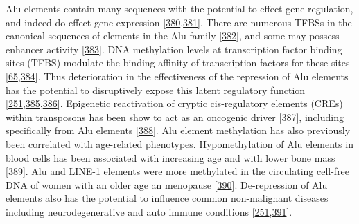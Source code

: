 \documentclass[
]{book}
\begin{document}
Alu elements contain many sequences with the potential to effect gene regulation, and indeed do effect gene expression {[}\protect\hyperlink{ref-Chen2017b}{380},\protect\hyperlink{ref-RobertoFerrari2019}{381}{]}.
There are numerous TFBSs in the canonical sequences of elements in the Alu family {[}\protect\hyperlink{ref-Polak2006}{382}{]}, and some may possess enhancer activity {[}\protect\hyperlink{ref-Su2014}{383}{]}.
DNA methylation levels at transcription factor binding sites (TFBS) modulate the binding affinity of transcription factors for these sites {[}\protect\hyperlink{ref-Yin2017}{65},\protect\hyperlink{ref-Blattler2014}{384}{]}.
Thus deterioration in the effectiveness of the repression of Alu elements has the potential to disruptively expose this latent regulatory function {[}\protect\hyperlink{ref-Chuong2017}{251},\protect\hyperlink{ref-Ward2013}{385},\protect\hyperlink{ref-Xie2013}{386}{]}.
Epigenetic reactivation of cryptic cis-regulatory elements (CREs) within transposons has been show to act as an oncogenic driver {[}\protect\hyperlink{ref-Jang2019}{387}{]}, including specifically from Alu elements {[}\protect\hyperlink{ref-Rajendiran2016}{388}{]}.
Alu element methylation has also previously been correlated with age-related phenotypes.
Hypomethylation of Alu elements in blood cells has been associated with increasing age and with lower bone mass {[}\protect\hyperlink{ref-Jintaridth2013}{389}{]}.
Alu and LINE-1 elements were more methylated in the circulating cell-free DNA of women with an older age an menopause {[}\protect\hyperlink{ref-Lu2018a}{390}{]}.
De-repression of Alu elements also has the potential to influence common non-malignant diseases including neurodegenerative and auto immune conditions {[}\protect\hyperlink{ref-Chuong2017}{251},\protect\hyperlink{ref-Payer2017}{391}{]}.
\end{document}
